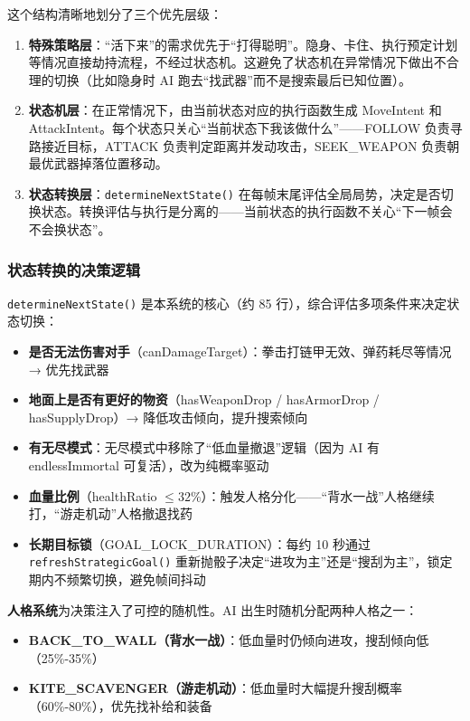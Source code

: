 \documentclass[utf8]{ctexart}
\begin{document}
这个结构清晰地划分了三个优先层级：

\begin{enumerate}
  \item \textbf{特殊策略层}：“活下来”的需求优先于“打得聪明”。隐身、卡住、执行预定计划等情况直接劫持流程，不经过状态机。这避免了状态机在异常情况下做出不合理的切换（比如隐身时 AI 跑去“找武器”而不是搜索最后已知位置）。
  \item \textbf{状态机层}：在正常情况下，由当前状态对应的执行函数生成 MoveIntent 和 AttackIntent。每个状态只关心“当前状态下我该做什么”——FOLLOW 负责寻路接近目标，ATTACK 负责判定距离并发动攻击，SEEK\_WEAPON 负责朝最优武器掉落位置移动。
  \item \textbf{状态转换层}：\texttt{determineNextState()} 在每帧末尾评估全局局势，决定是否切换状态。转换评估与执行是分离的——当前状态的执行函数不关心“下一帧会不会换状态”。
\end{enumerate}

\subsubsection{状态转换的决策逻辑}

\texttt{determineNextState()} 是本系统的核心（约 85 行），综合评估多项条件来决定状态切换：

\begin{itemize}
  \item \textbf{是否无法伤害对手}（canDamageTarget）：拳击打链甲无效、弹药耗尽等情况 → 优先找武器
  \item \textbf{地面上是否有更好的物资}（hasWeaponDrop / hasArmorDrop / hasSupplyDrop）→ 降低攻击倾向，提升搜索倾向
  \item \textbf{有无尽模式}：无尽模式中移除了“低血量撤退”逻辑（因为 AI 有 endlessImmortal 可复活），改为纯概率驱动
  \item \textbf{血量比例}（healthRatio $\leq 32\%$）：触发人格分化——“背水一战”人格继续打，“游走机动”人格撤退找药
  \item \textbf{长期目标锁}（GOAL\_LOCK\_DURATION）：每约 10 秒通过 \texttt{refreshStrategicGoal()} 重新抛骰子决定“进攻为主”还是“搜刮为主”，锁定期内不频繁切换，避免帧间抖动
\end{itemize}

\textbf{人格系统}为决策注入了可控的随机性。AI 出生时随机分配两种人格之一：
\begin{itemize}
  \item \textbf{BACK\_TO\_WALL（背水一战）}：低血量时仍倾向进攻，搜刮倾向低（25\%-35\%）
  \item \textbf{KITE\_SCAVENGER（游走机动）}：低血量时大幅提升搜刮概率（60\%-80\%），优先找补给和装备
\end{itemize}
\end{document}
